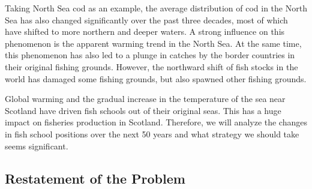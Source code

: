 \documentclass{mcmthesis}
\numberwithin{figure}{section}
\numberwithin{table}{section}
\begin{document}
Taking North Sea cod as an example, the average distribution of cod in the North Sea has also changed significantly over the past three decades, most of which have shifted to more northern and deeper waters. A strong influence on this phenomenon is the apparent warming trend in the North Sea. At the same time, this phenomenon has also led to a plunge in catches by the border countries in their original fishing grounds. However, the northward shift of fish stocks in the world has damaged some fishing grounds, but also spawned other fishing grounds.\cite{REF3} \cite{REFE} 

Global warming and the gradual increase in the temperature of the sea near Scotland have driven fish schools out of their original seas. This has a huge impact on fisheries production in Scotland. Therefore, we will analyze the changes in fish school positions over the next 50 years and what strategy we should take seems significant.

\subsection{Restatement of the Problem}




\end{document}
